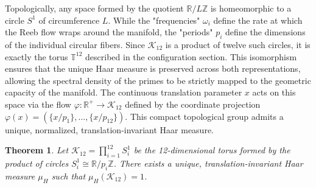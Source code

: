 \documentclass[sn-mathphys-num, pdflatex, referee]{sn-jnl}
\newtheorem{theorem}{Theorem}[section]
\begin{document}
Topologically, any space formed by the quotient $\mathbb{R}/L\mathbb{Z}$ is homeomorphic to a circle $S^1$ of circumference $L$. While the "frequencies" $\omega_i$ define the rate at which the Reeb flow wraps around the manifold, the "periods" $p_i$ define the dimensions of the individual circular fibers. Since $\mathcal{K}_{12}$ is a product of twelve such circles, it is exactly the torus $\mathbb{T}^{12}$ described in the configuration section. This isomorphism ensures that the unique Haar measure is preserved across both representations, allowing the spectral density of the primes to be strictly mapped to the geometric capacity of the manifold.
The continuous translation parameter $x$ acts on this space via the flow $\varphi : \mathbb{R}^+ \to \mathcal{K}_{12}$ defined by the coordinate projection $\varphi(x) = ( \{x/p_1\}, \dots, \{x/p_{12}\} )$. This compact topological group admits a unique, normalized, translation-invariant Haar measure.
\begin{theorem}
Let $\mathcal{K}_{12} = \prod_{i=1}^{12} \label{K12} S^1_i$ be the 12-dimensional torus formed by the product of circles $S^1_i \cong \mathbb{R}/p_i\mathbb{Z}$. There exists a unique, translation-invariant Haar measure $\mu_H$ such that $\mu_H(\mathcal{K}_{12}) = 1$.
\end{theorem}
\end{document}

